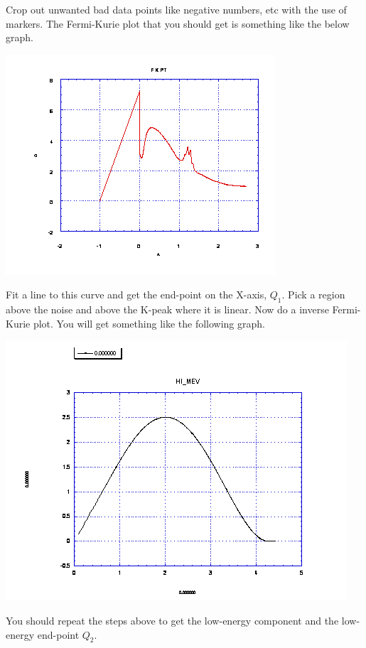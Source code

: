 \documentclass{../lab}
\begin{document}
Crop out unwanted bad data points like negative numbers, etc with the use of markers. The Fermi-Kurie plot that you should get is something like the below graph.
\begin{center}
    \href{http://experimentationlab.berkeley.edu/sites/default/files/images/BRAimage019.gif}{\includegraphics[width=0.5\linewidth]{images/BRAimage019.png}}
\end{center}
Fit a line to this curve and get the end-point on the X-axis, $Q_1$. Pick a region above the noise and above the K-peak where it is linear. Now do a inverse Fermi-Kurie plot. You will get something like the following graph.
\begin{center}
    \href{http://experimentationlab.berkeley.edu/sites/default/files/images/BRAimage021.gif}{\includegraphics[width=0.5\linewidth]{images/BRAimage021.png}}
\end{center}
You should repeat the steps above to get the low-energy component and the low-energy end-point $Q_2$.
\end{document}
